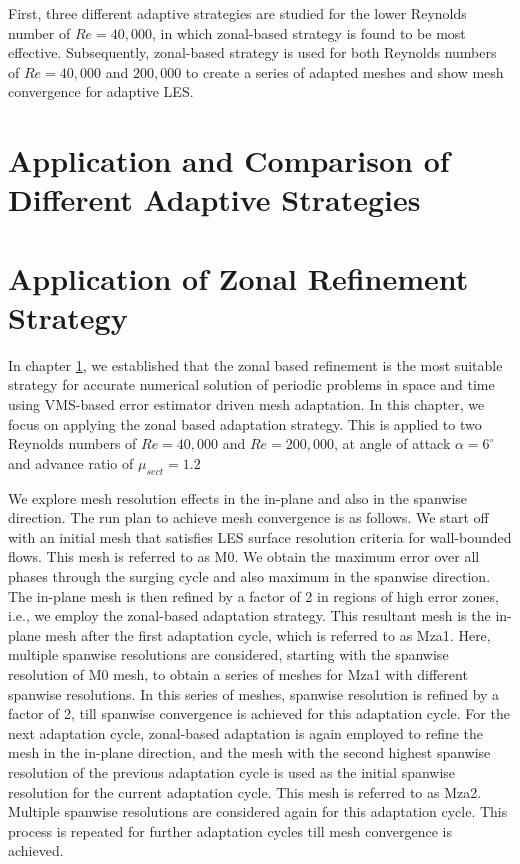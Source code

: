 First, three different adaptive strategies are studied for the lower Reynolds number of $Re=40,000$, in which zonal-based strategy is found to be most effective. Subsequently, zonal-based strategy is used for both Reynolds numbers of $Re=40,000$ and $200,000$ to create a series of adapted meshes and show mesh convergence for adaptive LES.


\section{Application and Comparison of Different Adaptive Strategies}
\label{sec:adaptive_strategy_comparison}




\section{Application of Zonal Refinement Strategy}


In chapter \ref{sec:adaptive_strategy_comparison}, we established that the zonal based refinement is the most suitable strategy for accurate numerical solution of periodic problems in space and time using VMS-based error estimator driven mesh adaptation. In this chapter, we focus on applying the zonal based adaptation strategy. This is applied to two Reynolds numbers of $Re=40,000$ and $Re=200,000$, at angle of attack $\alpha=6^\circ$ and advance ratio of $\mu_{sect}=1.2$

We explore mesh resolution effects in the in-plane and also in the spanwise direction. 
The run plan to achieve mesh convergence is as follows. 
We start off with an initial mesh that satisfies LES surface resolution criteria for wall-bounded flows. This mesh is referred to as M0.
We obtain the maximum error over all phases through the surging cycle and also maximum in the spanwise direction.
The in-plane mesh is then refined by a factor of 2 in regions of high error zones, i.e., we employ the zonal-based adaptation strategy.
This resultant mesh is the in-plane mesh after the first adaptation cycle, which is referred to as Mza1.
Here, multiple spanwise resolutions are considered, starting with the spanwise resolution of M0 mesh, to obtain a series of meshes for Mza1 with different spanwise resolutions.
In this series of meshes, spanwise resolution is refined by a factor of 2, till spanwise convergence is achieved for this adaptation cycle. 
For the next adaptation cycle, zonal-based adaptation is again employed to refine the mesh in the in-plane direction, and the mesh with the second highest spanwise resolution of the previous adaptation cycle is used as the initial spanwise resolution for the current adaptation cycle. 
This mesh is referred to as Mza2.
Multiple spanwise resolutions are considered again for this adaptation cycle.
This process is repeated for further adaptation cycles till mesh convergence is achieved.

